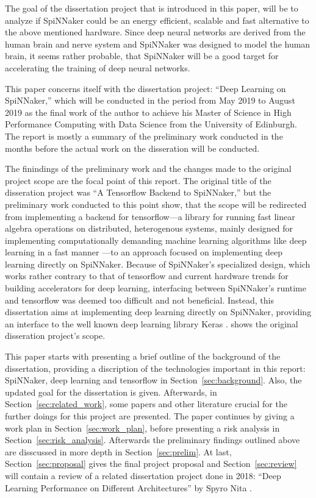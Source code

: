 \documentclass{article}
\begin{document}
The goal of the dissertation project that is introduced in
this paper, will be to analyze if SpiNNaker could be an
energy efficient, scalable and fast alternative to the
above mentioned hardware.
Since deep neural networks are derived from the human
brain and nerve system \citep{goodfellow2016} and SpiNNaker
was designed to model the human brain, it seems rather
probable, that SpiNNaker will be a good target for
accelerating the training of deep neural networks.

This paper concerns itself with the dissertation project:
``Deep Learning on SpiNNaker,'' which will be conducted in
the period from May 2019 to August 2019 as the final work
of the author to achieve his Master of Science in
High Performance Computing with Data Science from the
University of Edinburgh.
The report is mostly a summary of the preliminary work
conducted in the months before the actual work on the
disseration will be conducted.

The finindings of the preliminary work and the changes made
to the original project scope are the focal point of this
report.
The original title of the disseration project was ``A
Tensorflow Backend to SpiNNaker,'' but the preliminary work
conducted to this point show, that the scope will be
redirected from implementing a backend for tensorflow---a
library for running fast linear algebra operations on
distributed, heterogenous systems, mainly designed for
implementing computationally demanding machine learning
algorithms like deep learning in a fast manner
\citep{tf2015}---to an approach focused on implementing
deep learning directly on SpiNNaker.
Because of SpiNNaker's specialized design, which works
rather contrary to that of tensorflow and current hardware
trends for building accelerators for deep learning,
interfacing between SpiNNaker's runtime and tensorflow was
deemed too difficult and not beneficial.
Instead, this dissertation aims at implementing deep
learning directly on SpiNNaker, providing an interface to
the well known deep learning library Keras \citep{keras}.
\citet{proj} shows the original disseration project's
scope.

This paper starts with presenting a brief outline of the
background of the dissertation, providing a discription of
the technologies important in this report: SpiNNaker, deep
learning and tensorflow in Section~\ref{sec:background}.
Also, the updated goal for the dissertation is given.
Afterwards, in Section~\ref{sec:related_work}, some
papers and other literature crucial for the further doings
for this project are presented.
The paper continues by giving a work plan in
Section~\ref{sec:work_plan}, before presenting a risk
analysis in Section~\ref{sec:risk_analysis}.
Afterwards the preliminary findings outlined above are
disscussed in more depth in Section~\ref{sec:prelim}.
At last, Section~\ref{sec:proposal} gives the final
project proposal and Section~\ref{sec:review} will contain
a review of a related dissertation project done in 2018:
``Deep Learning Performance on Different Architectures'' by
Spyro Nita \citep{nita_2018}.
\end{document}
